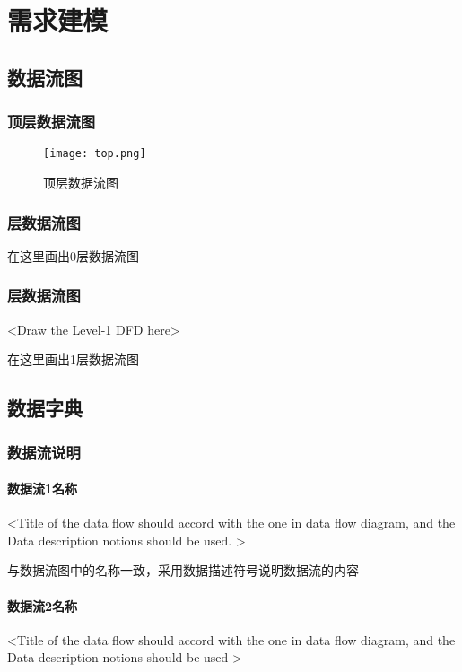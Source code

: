\chapter{需求建模 }
\section{数据流图}
\subsection{顶层数据流图}

\begin{figure}[ht]
\centering
\texttt{[image: top.png]}
\caption{顶层数据流图}\label{fig:noted-figure}
\end{figure}

\subsection{层数据流图}

在这里画出0层数据流图

\subsection{层数据流图}
<Draw the Level-1 DFD here>

在这里画出1层数据流图

\section{数据字典}
\subsection{数据流说明}
\subsubsection{数据流1名称}
<Title of  the data flow should accord with the one in data flow diagram, and the Data description notions should be used.  >

与数据流图中的名称一致，采用数据描述符号说明数据流的内容

\subsubsection{数据流2名称}
<Title of  the data flow should accord with the one in data flow diagram, and the Data description notions should be used   >

